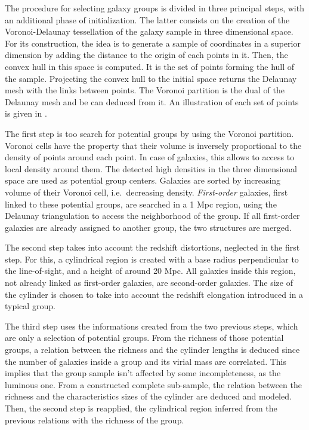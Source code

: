 The procedure for selecting galaxy groups is divided in three principal steps,
with an additional phase of initialization. The latter consists on the creation
of the Voronoi-Delaunay tessellation of the galaxy sample in three dimensional
space. For its construction, the idea is to generate a sample of coordinates in
a superior dimension by adding the distance to the origin of each points in it.
Then, the convex hull in this space is computed. It is the set of points
forming the hull of the sample. Projecting the convex hull to the initial space
returns the Delaunay mesh with the links between points. The Voronoi partition
is the dual of the Delaunay mesh and be can deduced from it. An illustration of
each set of points is given in .

The first step is too search for potential groups by using the Voronoi
partition. Voronoi cells have the property that their volume is inversely
proportional to the density of points around each point. In case of galaxies,
this allows to access to local density around them. The detected high densities
in the three dimensional space are used as potential group centers. Galaxies
are sorted by increasing volume of their Voronoi cell, i.e.\ decreasing
density. \emph{First-order} galaxies, first linked to these potential groups,
are searched in a 1 Mpc region, using the Delaunay triangulation to access the
neighborhood of the group. If all first-order galaxies are already assigned to
another group, the two structures are merged.

The second step takes into account the redshift distortions, neglected in the
first step. For this, a cylindrical region is created with a base radius
perpendicular to the line-of-sight, and a height of around 20 Mpc. All galaxies
inside this region, not already linked as first-order galaxies, are
second-order galaxies. The size of the cylinder is chosen to take into account
the redshift elongation introduced in a typical group.

The third step uses the informations created from the two previous steps, which
are only a selection of potential groups. From the richness of those potential
groups, a relation between the richness and the cylinder lengths is deduced
since the number of galaxies inside a group and its virial mass are correlated.
This implies that the group sample isn't affected by some incompleteness, as
the luminous one. From a constructed complete sub-sample, the relation between
the richness and the characteristics sizes of the cylinder are deduced and
modeled. Then, the second step is reapplied, the cylindrical region inferred
from the previous relations with the richness of the group.

